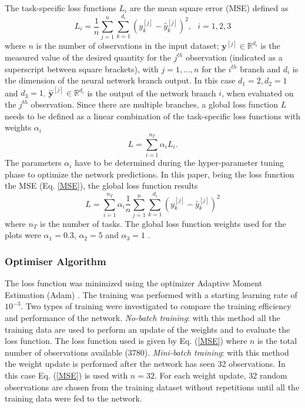 \documentclass[9pt,twocolumn,twoside,pdftex]{optica}
\begin{document}
The task-specific loss functions $L_i$ are the mean square error (MSE) defined as
\begin{equation}
L_i = \frac{1}{n} \sum_{j=1}^n \sum_{k=1}^{d_i} (y_k^{[j]}-\hat y_k^{[j]})^2, \ \ \ i=1,2,3
\label{MSE}
\end{equation}
where $n$ is the number of observations in the input dataset; ${\mathbold y}^{[j]} \in \mathbb{R}^{d_i}$ is the measured value of the desired quantity for the $j^{th}$ observation (indicated as a superscript between square brackets), with $j=1, ..., n$ for the $i^{th}$ branch and $d_i$ is the dimension of the neural network branch output. In this case $d_1=2, d_2=1$ and $d_3=1$. $ \hat {\mathbold y}^{[j]} \in \mathbb{R}^{d_i}$ is the output of the network branch $i$, when evaluated on the $j^{th}$ observation. Since there are multiple branches, a global loss function $L$ needs to be defined as a linear combination of the task-specific loss functions with weights $\alpha_i$ 
\begin{equation}
L = \sum_{i=1}^{n_T}\alpha_i L_i .
\label{globalcf}
\end{equation}
The parameters $\alpha_i$ have to be determined during the hyper-parameter tuning phase to optimize the network predictions.
In this paper, being the loss function the MSE (Eq. \ref{MSE}), the global loss function results
\begin{equation}
L = \sum_{i=1}^{n_T}\alpha_i \frac{1}{n} \sum_{j=1}^n \sum_{k=1}^{d_i} (y_k^{[j]}-\hat y_k^{[j]})^2
\end{equation}
where  $n_T$ is the number of tasks. The global loss function weights used for the plots were $\alpha_1 = 0.3$, $\alpha_2 = 5$ and $\alpha_3 = 1$ \cite{Michelucci2019_2}.
 

\subsubsection{Optimiser Algorithm}
\label{training}

The loss function was minimized using the optimizer Adaptive Moment Estimation (Adam) \cite{Kingma2014, Michelucci2017}. The training was performed with a starting learning rate of $10^{-3}$. Two types of training were investigated to compare the training efficiency and performance of the network. {\sl No-batch training}: with this method all the training data  are used to perform an update of the weights and to evaluate the loss function. The loss function used is given by Eq. (\ref{MSE}) where $n$ is the total number of observations available (3780). {\sl Mini-batch training}: with this method the weight update is performed after the network has seen 32 observations. In this case Eq. (\ref{MSE}) is used with $n=32$. For each weight update, 32 random observations are chosen from the training dataset without repetitions until all the training data were fed to the network.  
\end{document}
